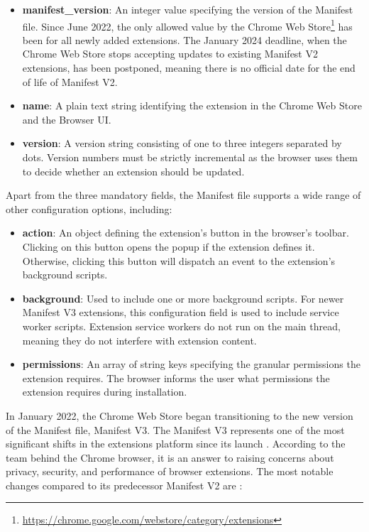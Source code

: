 \begin{itemize}
	\item \textbf{manifest\_version}: An integer value specifying the version of the Manifest file. Since June 2022, the only allowed value by the Chrome Web Store\footnote{{\url{https://chrome.google.com/webstore/category/extensions}}} has been  for all newly added extensions. The January 2024 deadline, when the Chrome Web Store stops accepting updates to existing Manifest V2 extensions, has been postponed, meaning there is no official date for the end of life of Manifest V2.
	\item \textbf{name}: A plain text string identifying the extension in the Chrome Web Store and the Browser UI.
	\item \textbf{version}: A version string consisting of one to three integers separated by dots. Version numbers must be strictly incremental as the browser uses them to decide whether an extension should be updated.
\end{itemize}

Apart from the three mandatory fields, the Manifest file supports a wide range of other configuration options, including:

\begin{itemize}
	\item \textbf{action}: An object defining the extension's button in the browser's toolbar. Clicking on this button opens the popup if the extension defines it. Otherwise, clicking this button will dispatch an event to the extension's background scripts.
	\item \textbf{background}: Used to include one or more background scripts. For newer Manifest V3 extensions, this configuration field is used to include service worker scripts. Extension service workers do not run on the main thread, meaning they do not interfere with extension content.
	\item \textbf{permissions}: An array of string keys specifying the granular permissions the extension requires. The browser informs the user what permissions the extension requires during installation.
\end{itemize}

In January 2022, the Chrome Web Store began transitioning to the new version of the Manifest file, Manifest V3. The Manifest V3 represents one of the most significant shifts in the extensions platform since its launch \cite{ChromeWebExtensions}. According to the team behind the Chrome browser, it is an answer to raising concerns about privacy, security, and performance of browser extensions. The most notable changes compared to its predecessor Manifest V2 are \cite{ChromeWebExtensions}:

